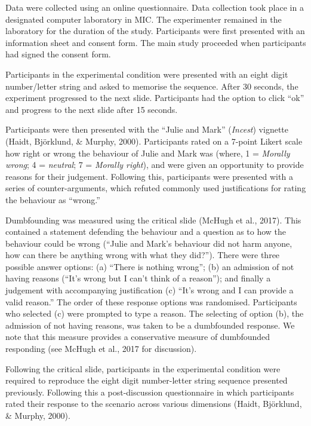 \documentclass[
  american,
  man,floatsintext]{apa7}
\begin{document}
Data were collected using an online questionnaire. Data collection took place in a designated computer laboratory in MIC. The experimenter remained in the laboratory for the duration of the study. Participants were first presented with an information sheet and consent form. The main study proceeded when participants had signed the consent form.

Participants in the experimental condition were presented with an eight digit number/letter string and asked to memorise the sequence. After 30 seconds, the experiment progressed to the next slide. Participants had the option to click ``ok'' and progress to the next slide after 15 seconds.

Participants were then presented with the ``Julie and Mark'' (\emph{Incest}) vignette (Haidt, Björklund, \& Murphy, 2000). Participants rated on a 7-point Likert scale how right or wrong the behaviour of Julie and Mark was (where, 1 = \emph{Morally wrong}; 4 = \emph{neutral}; 7 = \emph{Morally right}), and were given an opportunity to provide reasons for their judgement. Following this, participants were presented with a series of counter-arguments, which refuted commonly used justifications for rating the behaviour as ``wrong.''

Dumbfounding was measured using the critical slide (McHugh et al., 2017). This contained a statement defending the behaviour and a question as to how the behaviour could be wrong (``Julie and Mark's behaviour did not harm anyone, how can there be anything wrong with what they did?''). There were three possible answer options: (a) ``There is nothing wrong''; (b) an admission of not having reasons (``It's wrong but I can't think of a reason''); and finally a judgement with accompanying justification (c) ``It's wrong and I can provide a valid reason.'' The order of these response options was randomised. Participants who selected (c) were prompted to type a reason. The selecting of option (b), the admission of not having reasons, was taken to be a dumbfounded response. We note that this measure provides a conservative measure of dumbfounded responding (see McHugh et al., 2017 for discussion).

Following the critical slide, participants in the experimental condition were required to reproduce the eight digit number-letter string sequence presented previously. Following this a post-discussion questionnaire in which participants rated their response to the scenario across various dimensions (Haidt, Björklund, \& Murphy, 2000).
\end{document}
